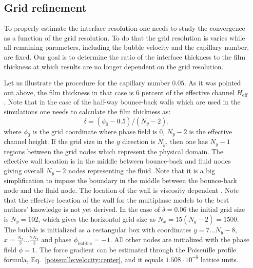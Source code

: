 \documentclass[preprint,12pt]{elsarticle}
\begin{document}
\subsection{Grid refinement}
To properly estimate the interface resolution one needs to study the convergence as a function of
the grid resolution. To do that the grid resolution is varies while all remaining parameters,
including the bubble velocity and the capillary number, are fixed.  Our goal is to determine the 
ratio of the interface thickness to the 
film thickness at which results are no longer dependent on the grid resolution.

Let us illustrate the procedure for the capillary number
$0.05$. As it was pointed out above, the film thickness in that case is $6$ percent of the
effective
channel $H_{\mathrm{eff}}$.
Note that in the case of the half-way bounce-back walls \cite{yu} which are used in the
simulations one needs to calculate the film thickness as:
\begin{equation}
\delta=(\phi_0-0.5)/(N_y-2),
\end{equation}
where $\phi_0$ is the grid coordinate where phase field is $0$, $N_y-2$
is the effective channel height.
If the grid size in the $y$ direction is $N_y$, then one has $N_y-1$ regions between the grid nodes
which represent
the physical domain. The effective wall location is in the middle between bounce-back and fluid nodes giving
overall $N_y-2$ nodes representing the fluid. Note that it is a big
simplification to impose the boundary in the middle between the bounce-back
node and the fluid node. The location of the wall is
viscosity dependent \cite{ginzburg-multireflection}.  Note that the effective location of the
wall for the
multiphase models to the best authors' knowledge is not yet derived. In the case of $\delta=0.06$
the
initial grid size is $N_y=102$, which gives the horizontal grid size as $N_x=15(N_y-2)=1500$.
The bubble is initialized as a rectangular box with coordinates
$y=7\dots N_y-8$, $x=\frac{N_x}{3}\dots \frac{2 N_x}{3}$ and phase
$\phi_{\mathrm{bubble}}=-1$. All other nodes are initialized with the phase field
$\phi=1$. The force gradient can be estimated through the Poiseuille
profile formula, Eq.~\ref{poiseuille:velocity:center}, and it equals
$1.508 \cdot 10^{-6}$ lattice units.
\end{document}
